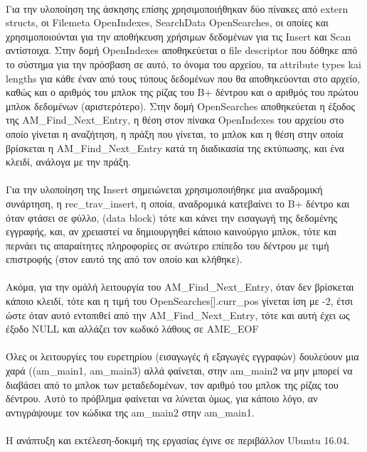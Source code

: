 \documentclass{article}
\begin{document}
\paragraph{}
Για την υλοποίηση της άσκησης επίσης χρησιμοποιήθηκαν δύο πίνακες από \textlatin{extern structs}, οι \textlatin{Filemeta OpenIndexes, SearchData OpenSearches}, οι οποίες και χρησιμοποιούνται για την αποθήκευση χρήσιμων δεδομένων για τις \textlatin{Insert} και \textlatin{Scan} αντίστοιχα. Στην δομή  \textlatin{OpenIndexes} αποθηκεύεται ο
\textlatin{file descriptor} που δόθηκε από το σύστημα για την πρόσβαση σε αυτό, το όνομα του αρχείου, τα \textlatin{attribute types kai lengths} για κάθε έναν από τους τύπους δεδομένων που θα αποθηκεύονται στο αρχείο, καθώς και ο αριθμός του μπλοκ της ρίζας του Β+ δέντρου και ο αριθμός του πρώτου μπλοκ δεδομένων (αριστερότερο). 
Στην δομή \textlatin{OpenSearches} αποθηκεύεται η έξοδος της 
\textlatin{AM\_Find\_Next\_Entry},  
η θέση στον πίνακα \textlatin{OpenIndexes} του αρχείου στο οποίο γίνεται η αναζήτηση, η πράξη που γίνεται, το μπλοκ και η θέση στην οποία βρίσκεται η \textlatin{AM\_Find\_Next\_Entry} κατά τη διαδικασία της εκτύπωσης, και ένα κλειδί, ανάλογα με την πράξη.  
  
\paragraph{}
Για την υλοποίηση της \textlatin{Insert} σημειώνεται χρησιμοποιήθηκε μια αναδρομική συνάρτηση, η \textlatin{rec\_trav\_insert}, η οποία, αναδρομικά κατεβαίνει το Β+ δέντρο και όταν φτάσει σε φύλλο, \textlatin{(data block)} τότε και κάνει την εισαγωγή της δεδομένης εγγραφής, και, αν χρειαστεί να δημιουργηθεί κάποιο καινούργιο μπλοκ, τότε και περνάει τις απαραίτητες πληροφορίες σε ανώτερο επίπεδο του δέντρου με τιμή επιστροφής (στον εαυτό της από τον οποίο και κλήθηκε).

\paragraph{}
Ακόμα, για την ομάλή λειτουργία του \textlatin{AM\_Find\_Next\_Entry}, όταν δεν βρίσκεται κάποιο κλειδί, τότε και η τιμή του
\textlatin{OpenSearches[].curr\_pos} γίνεται ίση με -2, έτσι ώστε όταν αυτό εντοπιθεί από την \textlatin{AM\_Find\_Next\_Entry}, τότε και αυτή έχει ως έξοδο \textlatin{NULL} και αλλάζει τον κωδικό λάθους σε \textlatin{AME\_EOF}


\paragraph{}
Όλες οι λειτουργίες του ευρετηρίου (εισαγωγές ή εξαγωγές εγγραφών) δουλεύουν μια χαρά (\textlatin{(am\_main1, am\_main3)} αλλά φαίνεται, στην \textlatin{am\_main2} να μην μπορεί να διαβάσει από το μπλοκ των μεταδεδομένων, τον αριθμό του μπλοκ της ρίζας του δέντρου. Αυτό το πρόβλημα φαίνεται να λύνεται όμως, για κάποιο λόγο, αν αντιγράψουμε τον κώδικα της \textlatin{am\_main2} στην \textlatin{am\_main1}. 


\paragraph{}
Η ανάπτυξη και εκτέλεση-δοκιμή της εργασίας έγινε σε περιβάλλον \textlatin{Ubuntu 16.04}.
\end{document}
